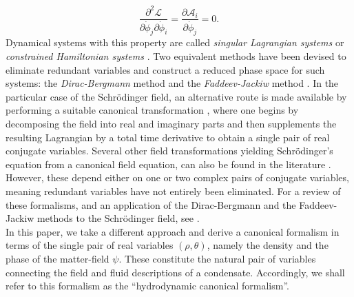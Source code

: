 \documentclass[twocolumn, nofootinbib, nobibnotes, amsmath,amssymb,aps, pra, floatfix]{revtex4-1}
\newcommand{\pd}[2]{\frac{\partial #1}{\partial #2}} %
\begin{document}
\begin{equation}
  \frac{\partial^2\mathcal{L}}{\partial\dot{\phi}_j\partial\dot{\phi}_i}=\pd{\mathcal{A}_i}{\dot{\phi}_j}=0.
  \label{eq:non_invertibility_condition}
\end{equation}
Dynamical systems with this property are called \textit{singular Lagrangian systems} or \textit{constrained Hamiltonian systems} \cite{henneaux1992quantization,sundermeyer1982constrained}.
Two equivalent \cite{barcelos1992symplectic} methods have been devised to eliminate redundant variables and construct a reduced phase space for such systems: the \textit{Dirac-Bergmann} method \cite{dirac1958generalized,dirac2001lectures,sundermeyer1982constrained,das2008lectures,gitman2012quantization,rothe2010classical,burnel2009canonical,mitra2014symmetries,maskawa1976singular,weinberg1995quantum} and the \textit{Faddeev-Jackiw} method \cite{faddeev1988hamiltonian,jackiw1994quantization,drummond2014quantum,ma14ller2006introduction,rothe2010classical}.
In the particular case of the Schr{\"o}dinger field, an alternative route is made available by performing a suitable canonical transformation \cite{kerman1976hamiltonian,cohen1992atom}, where one begins by decomposing the field into real and imaginary parts and then supplements the resulting Lagrangian by a total time derivative to obtain a single pair of real conjugate variables.
Several other field transformations yielding Schr{\"o}dinger's equation from a canonical field equation, can also be found in the literature \cite{henley1959elementary,schiff1968quantum}.
However, these depend either on one or two complex pairs of conjugate variables, meaning redundant variables have not entirely been eliminated.
For a review of these formalisms, and an application of the Dirac-Bergmann and the Faddeev-Jackiw methods to the Schr{\"o}dinger field, see \cite{gergely2002hamiltonian}.\\
In this paper, we take a different approach and derive a canonical formalism in terms of the single pair of real variables $\left(\rho,\theta\right)$, namely the density and the phase of the matter-field $\psi$.
These constitute the natural pair of variables connecting the field and fluid descriptions of a condensate.
Accordingly, we shall refer to this formalism as the ``hydrodynamic canonical formalism''.
\end{document}
